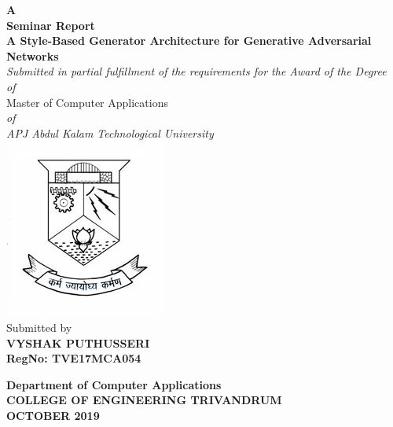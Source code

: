 \begin{titlepage}
\begin{center}
\textbf{ A  }\\
\vspace{0.35cm}
\textbf{ Seminar Report}\\
\vspace{0.55cm}
\textbf{\Large{A Style-Based Generator Architecture for Generative Adversarial Networks}}\\ \vspace{0.2cm}
\normalsize
\vspace{0.5cm}
\emph{Submitted in partial fulfillment of the requirements for the Award of the Degree}\\
\vspace{0.35cm}
\emph{of}\\
\vspace{0.35cm}
Master of Computer Applications\\
\vspace{0.35cm}
\emph{of}\\
\vspace{0.35cm}
\emph{ {APJ Abdul Kalam Technological University} }\\
\normalsize
\vspace{0.5cm}
\includegraphics[height=0.30\textwidth]{./cet}\\
\vspace{0.3cm}
Submitted by\\
\vspace{0.3cm}
\textbf{VYSHAK PUTHUSSERI}\\
\vspace{0.5cm}
\textbf{RegNo: TVE17MCA054 }\\
\vspace{1.8cm}

\normalsize
\textbf{Department of Computer Applications}\\[0.3cm]
\textbf{COLLEGE OF ENGINEERING TRIVANDRUM}\\[0.4cm]
\textbf{OCTOBER 2019}\\
\end{center}
\end{titlepage}

